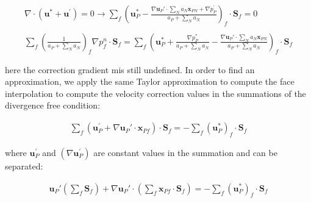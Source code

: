 \documentclass[final,3p,times,10pt,onecolumn]{myElsarticle}
\numberwithin{equation}{section}
\begin{document}
\begin{equation}\label{eq:pEqnSIMPLEC2}
\begin{split}
\nabla \cdot \left(\boldsymbol{u}^{*} + \boldsymbol{u}^{'}\right) = 0 \rightarrow
\sum_f \left(\boldsymbol{u}_P^{*} - \frac{\nabla \boldsymbol{u}_P' \cdot \sum_{N} a_{N}\boldsymbol{x}_{PN} + \nabla p_P^{'}}{a_P + \sum_{N} a_{N}}\right)_f \cdot \boldsymbol{S}_f
= 0 
\\
\\
\sum_f \left(\frac{1}{a_P + \sum_{N} a_{N}}\right)_f \nabla p_f^{n} \cdot \boldsymbol{S}_f
= \sum_f \left(\boldsymbol{u}_P^{*} + \frac{\nabla p_P^{*}}{a_P + \sum_{N} a_{N}} - \frac{\nabla \boldsymbol{u}_P' \cdot \sum_{N} a_{N}\boldsymbol{x}_{PN}}{a_P + \sum_{N} a_{N}}\right)_f \cdot \boldsymbol{S}_f
\end{split}
\end{equation}

\noindent here the correction gradient mis still undefined. In order to find an approximation, we apply the same Taylor approximation to compute the face interpolation to compute the velocity correction values in the summations of the divergence free condition:

\begin{equation}\label{eq:ugradDef1}
\begin{split}
\sum_f \left(\boldsymbol{u}_P^{'} + \nabla \boldsymbol{u}_P' \cdot \boldsymbol{x}_{Pf}\right)
\cdot
\boldsymbol{S}_f
= -\sum_f \left(\boldsymbol{u}_P^{*}\right)_f \cdot \boldsymbol{S}_f
\end{split}
\end{equation}

\noindent where $\boldsymbol{u}_P^{'}$ and $(\nabla \boldsymbol{u}_P^{'})$ are constant values in the summation and can be separated:

\begin{equation}\label{eq:ugradDef2}
\begin{split}
\boldsymbol{u}_P' \left(\sum_f \boldsymbol{S}_f\right) + \nabla \boldsymbol{u}_P' \cdot \left(\sum_f \boldsymbol{x}_{Pf} \cdot \boldsymbol{S}_f\right) = -\sum_f \left(\boldsymbol{u}_P^{*}\right)_f \cdot \boldsymbol{S}_f
\end{split}
\end{equation}
\end{document}
